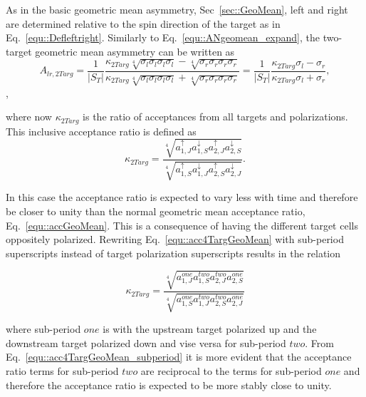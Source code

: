 As in the basic geometric mean asymmetry, Sec~\ref{sec::GeoMean}, left and right
are determined relative to the spin direction of the target as in
Eq.~\ref{equ::Defleftright}.  Similarly to Eq.~\ref{equ::ANgeomean_expand}, the
two-target geometric mean asymmetry can be written as
\begin{equation}
  A_{lr,2Targ}= \frac{1}{|S_T|}
  \frac{
    \kappa_{2Targ} \sqrt[4]{\sigma_l\sigma_l\sigma_l\sigma_l} -
    \sqrt[4]{\sigma_r\sigma_r\sigma_r\sigma_r}
  }{
    \kappa_{2Targ} \sqrt[4]{\sigma_l\sigma_l\sigma_l\sigma_l} +
    \sqrt[4]{\sigma_r\sigma_r\sigma_r\sigma_r}
  }
  =
  \frac{1}{|S_T|}
  \frac{\kappa_{2Targ}\sigma_l - \sigma_r}{
    \kappa_{2Targ}\sigma_l + \sigma_r},
  \label{equ::AN2targAcceptCancel}
\end{equation},

\noindent
where now $\kappa_{2Targ}$ is the ratio of acceptances from all targets and
polarizations.  This inclusive acceptance ratio is defined as
\begin{equation}
  \label{equ::acc4TargGeoMean}
  \kappa_{2Targ} =
  \frac{
    \sqrt[4]{
      a^\uparrow_{1,J}
      a^\downarrow_{1,S}
      a^\uparrow_{2,J}
      a^\downarrow_{2,S}}
  }{
    \sqrt[4]{
      a^\uparrow_{1,S}
      a^\downarrow_{1,J}
      a^\uparrow_{2,S}
      a^\downarrow_{2,J}}
  }.
\end{equation}

\noindent
In this case the acceptance ratio is expected to vary less with time and
therefore be closer to unity than the normal geometric mean acceptance ratio,
Eq.~\ref{equ::accGeoMean}.  This is a consequence of having the different target
cells oppositely polarized.  Rewriting Eq.~\ref{equ::acc4TargGeoMean} with
sub-period superscripts instead of target polarization superscripts results in
the relation

\begin{equation}
  \label{equ::acc4TargGeoMean_subperiod}
  \kappa_{2Targ} =
  \frac{ \sqrt[4]{ a^{one}_{1,J} a^{two}_{1,S} a^{two}_{2,J} a^{one}_{2,S} }
  }{
    \sqrt[4]{ a^{one}_{1,S} a^{two}_{1,J} a^{two}_{2,S} a^{one}_{2,J} }
  }
\end{equation}

\noindent
where sub-period $one$ is with the upstream target polarized up and the
downstream target polarized down and vise versa for sub-period $two$.  From
Eq.~\ref{equ::acc4TargGeoMean_subperiod} it is more evident that the acceptance
ratio terms for sub-period $two$ are reciprocal to the terms for sub-period
$one$ and therefore the acceptance ratio is expected to be more stably close to
unity.

